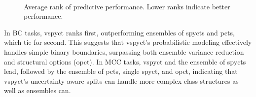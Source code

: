 \documentclass[3p,review,authoryear]{elsarticle}
\begin{document}
\begin{figure}[h!]
{        \label{fig:subfig2}
    } \\
    \caption{Average rank of predictive performance. Lower ranks indicate better performance.}
    \label{fig:avg_rank}
\end{figure}

In BC tasks, \gls{vspyct} ranks first, outperforming ensembles of \glspl{spyct} and \glspl{pct}, which tie for second. This suggests that \gls{vspyct}’s probabilistic modeling effectively handles simple binary boundaries, surpassing both ensemble variance reduction and structural options (\gls{opct}).
In MCC tasks, \gls{vspyct} and the ensemble of \glspl{spyct} lead, followed by the ensemble of \glspl{pct}, single \gls{spyct}, and \gls{opct}, indicating that \gls{vspyct}’s uncertainty-aware splits can handle more complex class structures as well as ensembles can.
\end{document}

